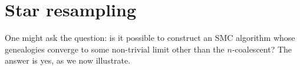 %
%
%
%




\section{Star resampling}
One might ask the question: is it possible to construct an SMC algorithm whose genealogies converge to some non-trivial limit other than the $n$-coalescent?
The answer is yes, as we now illustrate.


